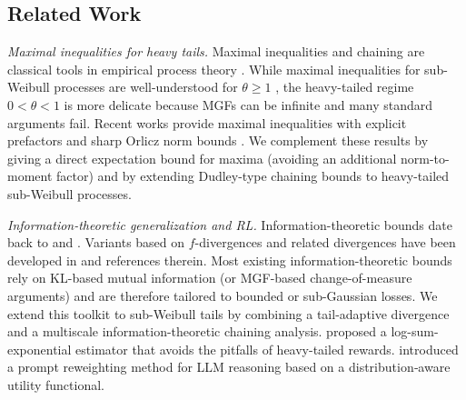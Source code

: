 \documentclass[11pt]{article}
\renewcommand{\paragraph}[1]{\noindent\textit{#1}}
\begin{document}
\subsection*{Related Work}

\paragraph{Maximal inequalities for heavy tails.}
Maximal inequalities and chaining are classical tools in empirical process
theory \citep{Talagrand2005,vanhandle2016probability}.
While maximal inequalities for sub-Weibull processes are well-understood for
$\theta\ge 1$ \citep{kuchibhotla2022moving}, the heavy-tailed regime $0<\theta<1$ is more
delicate because MGFs can be infinite and many standard
arguments fail.  Recent works provide maximal inequalities with explicit
prefactors \citep{mendes2023concentration} and sharp Orlicz norm bounds
\citep{zhang2022sharper}. We complement these results by giving a direct
expectation bound for maxima (avoiding an additional norm-to-moment factor) and
by extending Dudley-type chaining bounds to heavy-tailed sub-Weibull processes.



\paragraph{Information-theoretic generalization and RL.}
Information-theoretic bounds date back to \citet{Russo20} and
\citet{xu2017}. Variants based on $f$-divergences and related divergences
have been developed in \citep{jiao2017dependence,hellstrom2025generalization,bu2020}
and references therein.  Most existing information-theoretic bounds rely on
KL-based mutual information (or MGF-based change-of-measure arguments) and are
therefore tailored to bounded or sub-Gaussian losses. We extend this
toolkit to sub-Weibull tails by combining a tail-adaptive divergence and a
multiscale information-theoretic chaining analysis. \cite{behnamnia2025log} proposed a log-sum-exponential estimator that avoids the pitfalls of heavy-tailed rewards. \cite{sun2026curverl} introduced a prompt reweighting method for LLM reasoning based on a distribution‑aware utility functional.
\end{document}
